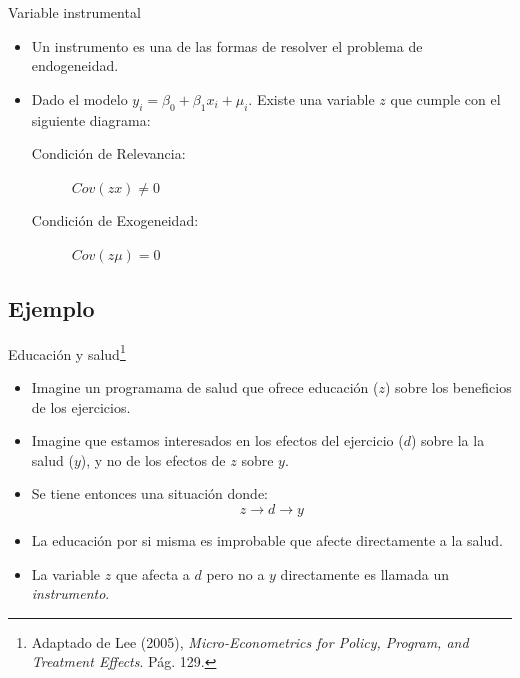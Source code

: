 \begin{frame}{Variable instrumental}
	\begin{itemize}
		\item Un instrumento es una de las formas de resolver el problema de endogeneidad.
		\item Dado el modelo $y_i=\beta_0+\beta_1 x_i+\mu_i$. Existe una variable $z$ que cumple con el siguiente diagrama:
			\begin{description}
				\item[Condición de Relevancia:] $Cov(zx) \neq 0$
				\item[Condición de Exogeneidad:] $Cov(z\mu) = 0$
			\end{description}
	\end{itemize}
\end{frame}

\subsection{Ejemplo}
\begin{frame}{Educación y salud\footnote{Adaptado de Lee (2005), \emph{Micro-Econometrics for Policy, Program, and Treatment Effects}. Pág. 129.}}
	\begin{itemize}
		\item Imagine un programama de salud que ofrece educación ($z$) sobre los beneficios de los ejercicios.
		\item Imagine que estamos interesados en los efectos del ejercicio ($d$) sobre la la salud ($y$), y no de los efectos de $z$ sobre $y$.
		\item Se tiene entonces una situación donde:
			\begin{equation*} 
				z \rightarrow d \rightarrow y
			\end{equation*}
		\item La educación por si misma es improbable que afecte directamente a la salud.
		\item La variable $z$ que afecta a $d$ pero no a $y$ directamente es llamada un 
		\emph{instrumento}.
	\end{itemize}
\end{frame}